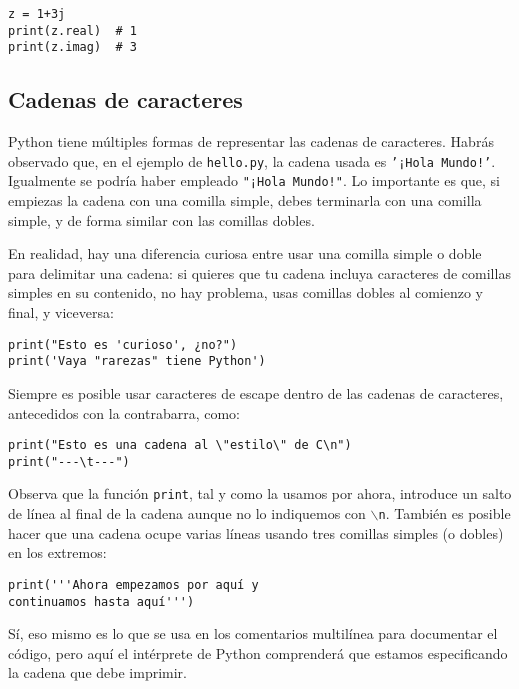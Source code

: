 \begin{lstlisting}
z = 1+3j
print(z.real)  # 1
print(z.imag)  # 3
\end{lstlisting}

\subsection{Cadenas de caracteres}

Python tiene múltiples formas de representar las cadenas de caracteres. Habrás observado que, en el ejemplo de \texttt{hello.py}, la cadena usada es \texttt{'¡Hola Mundo!'}. Igualmente se podría haber empleado \texttt{"¡Hola Mundo!"}. Lo importante es que, si empiezas la cadena con una comilla simple, debes terminarla con una comilla simple, y de forma similar con las comillas dobles.

En realidad, hay una diferencia curiosa entre usar una comilla simple o doble para delimitar una cadena: si quieres que tu cadena incluya caracteres de comillas simples en su contenido, no hay problema, usas comillas dobles al comienzo y final, y viceversa:

\begin{lstlisting}
print("Esto es 'curioso', ¿no?")
print('Vaya "rarezas" tiene Python')
\end{lstlisting}

Siempre es posible usar caracteres de escape dentro de las cadenas de caracteres, antecedidos con la contrabarra, como:

\begin{lstlisting}
print("Esto es una cadena al \"estilo\" de C\n")
print("---\t---")
\end{lstlisting}

Observa que la función \texttt{print}, tal y como la usamos por ahora, introduce un salto de línea al final de la cadena aunque no lo indiquemos con \texttt{$\backslash$n}. También es posible hacer que una cadena ocupe varias líneas usando tres comillas simples (o dobles) en los extremos:

\lstset{language=C}

\begin{lstlisting}
print('''Ahora empezamos por aquí y
continuamos hasta aquí''')
\end{lstlisting}

\lstset{language=Python}

Sí, eso mismo es lo que se usa en los comentarios multilínea para documentar el código, pero aquí el intérprete de Python comprenderá que estamos especificando la cadena que debe imprimir.

